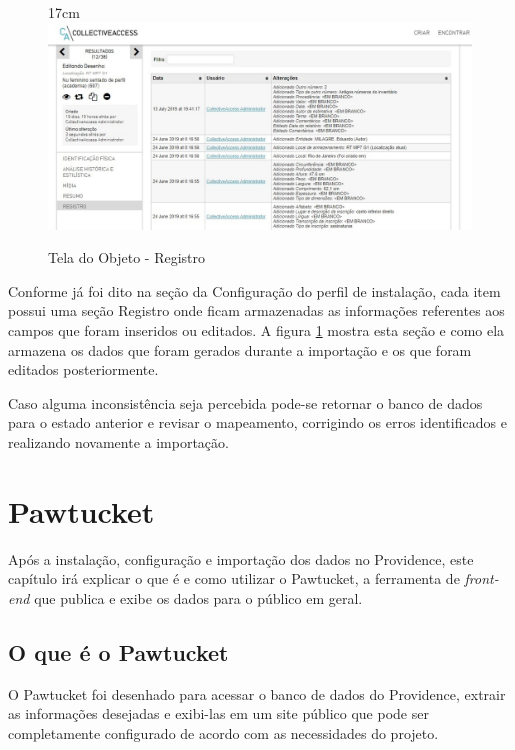 \documentclass[a4paper,12pt,oneside,onecolumn,final,fleqn]{repUERJ}
\begin{document}
\begin{figure}[!ht]{17cm}
	\includegraphics[width=15cm, left]{figuras/tela_reg.jpg}
	\caption{Tela do Objeto - Registro} \label{fig:tela_reg}
\end{figure}

Conforme já foi dito na seção da Configuração do perfil de instalação, cada item possui uma seção Registro onde ficam armazenadas as informações referentes aos campos que foram inseridos ou editados. A figura \ref{fig:tela_reg} mostra esta seção e como ela armazena os dados que foram gerados durante a importação e os que foram editados posteriormente.

Caso alguma inconsistência seja percebida pode-se retornar o banco de dados para o estado anterior e revisar o mapeamento, corrigindo os erros identificados e realizando novamente a importação.

\chapter{Pawtucket}

Após a instalação, configuração e importação dos dados no Providence, este capítulo irá explicar o que é e como utilizar o Pawtucket, a ferramenta de \textit{front-end} que publica e exibe os dados para o público em geral.

\section{O que é o Pawtucket}

O Pawtucket foi desenhado para acessar o banco de dados do Providence, extrair as informações desejadas e exibi-las em um site público que pode ser completamente configurado de acordo com as necessidades do projeto. 
\end{document}

